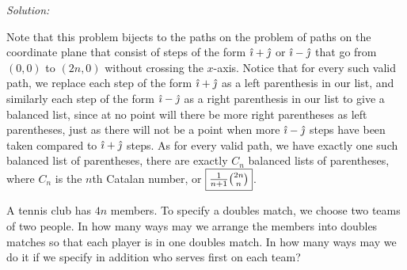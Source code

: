 \documentclass[12pt]{scrartcl}
\newenvironment{problem}[2][Problem]{\begin{trivlist}
\item[\hskip \labelsep {\bfseries #1}\hskip \labelsep {\bfseries #2.}]}{\end{trivlist}}
\newenvironment{solution}
    {\emph{Solution:}
    }
    {
    \qedhere
    }
\begin{document}
\begin{solution}
Note that this problem bijects to the paths on the problem of paths on the coordinate plane that consist of steps of the form $\hat \imath + \hat \jmath$ or $\hat \imath - \hat \jmath$ that go from $(0, 0)$ to $(2n, 0)$ without crossing the $x$-axis. Notice that for every such valid path, we replace each step of the form $\hat \imath + \hat \jmath$ as a left parenthesis in our list, and similarly each step of the form $\hat \imath - \hat \jmath$ as a right parenthesis in our list to give a balanced list, since at no point will there be more right parentheses as left parentheses, just as there will not be a point when more $\hat \imath - \hat \jmath$ steps have been taken compared to $\hat \imath + \hat \jmath$ steps. As for every valid path, we have exactly one such balanced list of parentheses, there are exactly $\boxed{C_n}$ balanced lists of parentheses, where $C_n$ is the $n$th Catalan number, or $\boxed{\tfrac{1}{n+1} \tbinom{2n}{n}}$. 
%
\end{solution}

\begin{problem}{5}
A tennis club has $4n$ members. To specify a doubles match, we choose two teams of two people. In how many ways may we arrange the members into doubles matches so that each player is in one doubles match. In how many ways may we do it if we specify in addition who serves first on each team? 
\end{problem}
\end{document}
